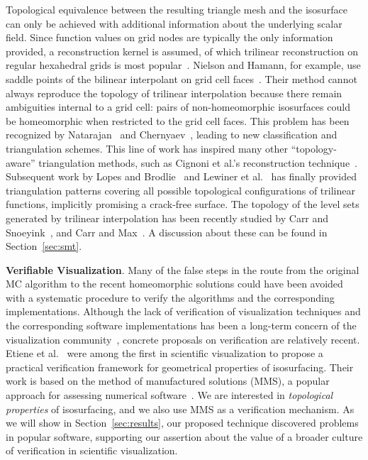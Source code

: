 Topological equivalence between the resulting triangle mesh and the isosurface
can only be achieved with additional information about the underlying
scalar field.
%
Since function values on grid nodes are typically the only information
provided, a reconstruction kernel is assumed, of which trilinear
reconstruction on regular hexahedral grids is most
popular~\cite{Nielson03onmarching}.
%
Nielson and
Hamann, for example,
use saddle points of the bilinear
interpolant on grid cell faces~\cite{Nielson:1991:ADR:949607.949621}. 
%
Their method cannot always reproduce the
topology of trilinear interpolation because there remain  ambiguities
internal to a grid cell: pairs of non-homeomorphic isosurfaces could
be homeomorphic when restricted to the grid cell faces.
%
This problem has been recognized by Natarajan~\cite{Natarajan:1994:GTC:205424.205429} and 
Chernyaev~\cite{Chernyaev95marchingcubes}, leading to new classification and
triangulation schemes.
%
This line of work has inspired many other ``topology-aware'' triangulation
methods,
such as Cignoni et al.'s reconstruction
technique~\cite{Cignoni00reconstructionof}.
%
Subsequent work by Lopes and Brodlie~\cite{lopes:tvcg:2003} and
Lewiner et al.~\cite{Lewiner:2003} has finally provided triangulation patterns covering
all possible topological configurations of trilinear functions, implicitly promising
a crack-free surface.
%
The topology of the level sets generated by trilinear interpolation
has been recently studied by Carr and Snoeyink~\cite{CS08}, and Carr
and Max~\cite{10.1109/TVCG.2009.10}. A discussion about these can be found in
Section~\ref{sec:smt}.

\textbf{Verifiable Visualization}.
Many of the false steps in the route from the
original MC algorithm to the recent homeomorphic solutions
could have been avoided with a systematic procedure to verify the
algorithms and the corresponding implementations. 
%
Although the lack of verification of visualization techniques and the
corresponding software implementations has been a long-term concern of
the visualization community~\cite{globus95,kirby-vv-08}, concrete
proposals on verification are relatively recent.
%
Etiene et al.~\cite{etiene:tvcg:2009} were among the first
in scientific visualization to propose a practical
verification framework for geometrical properties of isosurfacing.
Their work is
based on the method of manufactured solutions (MMS),
a popular approach for assessing numerical software~\cite{babuska04}. 
We are interested in \emph{topological properties} of
isosurfacing, and we also use MMS as a
verification mechanism. As we will show in Section~\ref{sec:results}, our proposed
technique discovered problems in popular software,
supporting our assertion about the value of a
broader culture of verification in scientific visualization.

